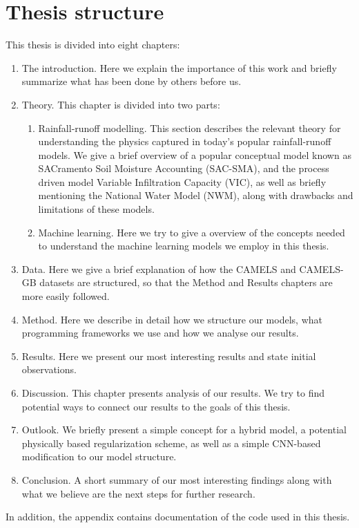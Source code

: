 \section{Thesis structure}
This thesis is divided into eight chapters:
\begin{enumerate}
\item  The introduction. Here we explain the importance of this work and briefly summarize what has been done by others before us.
\item Theory. This chapter is divided into two parts:
    \begin{enumerate}
    \item Rainfall-runoff modelling. This section describes the relevant theory 
        for understanding the physics captured in today's popular rainfall-runoff 
            models. We give a brief overview of a popular conceptual model known 
            as SACramento Soil Moisture Accounting (SAC-SMA), and 
            the process driven model Variable Infiltration Capacity (VIC), as well 
            as briefly mentioning the
            National Water Model (NWM), along with drawbacks and limitations 
            of these models. 
    \item Machine learning. Here we try to give a overview of the concepts 
        needed to understand the machine learning models we employ in this thesis. 
    \end{enumerate}
    \item Data. Here we give a brief explanation of how the CAMELS and CAMELS-GB 
    datasets are structured, so that the Method and Results chapters are more easily followed.
    \item Method. Here we describe in detail how we structure our models, what 
    programming frameworks we use and how we analyse our results.     
    \item Results. Here we present our most interesting results and state initial 
        observations.
    \item Discussion. This chapter presents analysis of our results. We try to 
        find potential ways to connect our results to the goals of this thesis.
    \item Outlook. We briefly present a simple concept for a hybrid model, a potential physically based regularization scheme, as well as a simple CNN-based modification to our model structure.
    \item Conclusion. A short summary of our most interesting findings along with 
        what we believe are the next steps for further research.
\end{enumerate}
In addition, the appendix contains documentation of the code used in this thesis.
\begin{comment}
\nocite{4160265}
\nocite{mckinney-proc-scipy-2010}
\nocite{2020NumPy-Array}
\nocite{2020SciPy-NMeth}
\nocite{NEURIPS2019_9015}
\nocite{Prechelt1998}
\end{comment}
